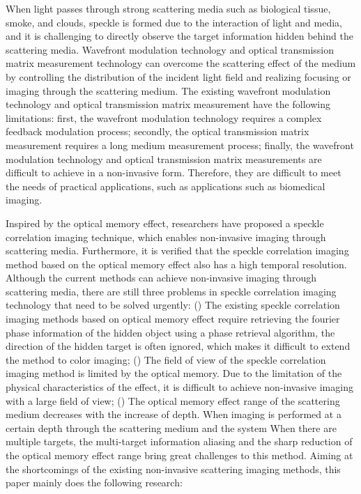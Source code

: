 \begin{englishabstract}
When light passes through strong scattering media such as biological tissue, smoke, and clouds, speckle is formed due to the interaction of light and media, and it is challenging to directly observe the target information hidden behind the scattering media. Wavefront modulation technology and optical transmission matrix measurement technology can overcome the scattering effect of the medium by controlling the distribution of the incident light field and realizing focusing or imaging through the scattering medium. The existing wavefront modulation technology and optical transmission matrix measurement have the following limitations: first, the wavefront modulation technology requires a complex feedback modulation process; secondly, the optical transmission matrix measurement requires a long medium measurement process; finally, the wavefront modulation technology and optical transmission matrix measurements are difficult to achieve in a non-invasive form. Therefore, they are difficult to meet the needs of practical applications, such as applications such as biomedical imaging.

Inspired by the optical memory effect, researchers have proposed a speckle correlation imaging technique, which enables non-invasive imaging through scattering media. Furthermore, it is verified that the speckle correlation imaging method based on the optical memory effect also has a high temporal resolution. Although the current methods can achieve non-invasive imaging through scattering media, there are still three problems in speckle correlation imaging technology that need to be solved urgently: () The existing speckle correlation imaging methods based on optical memory effect require retrieving the fourier phase information of the hidden object using a phase retrieval algorithm, the direction of the hidden target is often ignored, which makes it difficult to extend the method to color imaging; () The field of view of the speckle correlation imaging method is limited by the optical memory. Due to the limitation of the physical characteristics of the effect, it is difficult to achieve non-invasive imaging with a large field of view; () The optical memory effect range of the scattering medium decreases with the increase of depth. When imaging is performed at a certain depth through the scattering medium and the system When there are multiple targets, the multi-target information aliasing and the sharp reduction of the optical memory effect range bring great challenges to this method. Aiming at the shortcomings of the existing non-invasive scattering imaging methods, this paper mainly does the following research:


\end{englishabstract}
